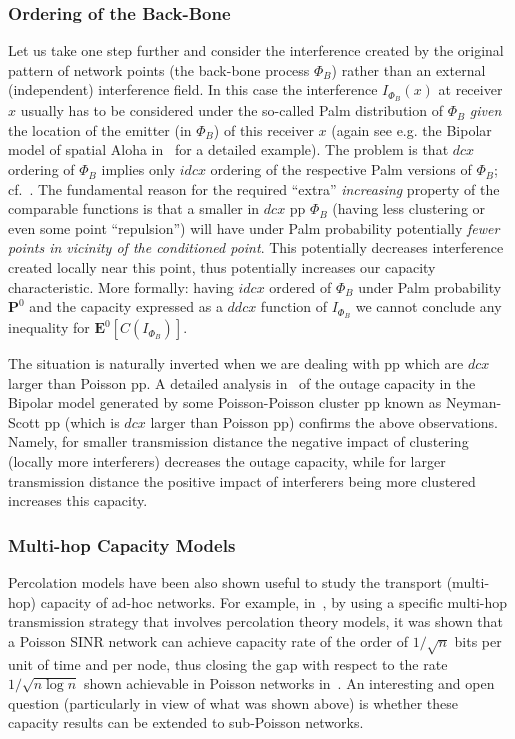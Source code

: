 \documentclass[conference]{IEEEtran}
\begin{document}
\subsubsection{Ordering of the Back-Bone}
Let us take one step further and consider the interference created by
the original pattern of network points (the back-bone process
$\Phi_B$) rather than an external (independent) interference field. 
In this case the interference $I_{\Phi_B}(x)$ at receiver $x$ usually has to be
considered under the so-called Palm distribution 
of $\Phi_B$ {\em given} the location of the emitter (in $\Phi_B$) of
this receiver $x$ (again see e.g. the Bipolar model of
spatial Aloha in~\cite[Chapter~16]{FnT2} for a detailed example).
The problem is that $dcx$ ordering of $\Phi_B$ implies only $idcx$
ordering of the respective Palm versions of $\Phi_B$;
cf.~\cite{snorder}. The fundamental
reason for the required ``extra'' {\em increasing} property  of the
comparable functions is that a smaller in $dcx$ pp $\Phi_B$ 
(having less clustering or even some point ``repulsion'') will  
have under Palm probability 
potentially {\em fewer points in vicinity of the conditioned point}.
This potentially decreases interference created locally near this
point, thus potentially increases our capacity characteristic.
More formally: having $idcx$ ordered of $\Phi_B$ under Palm
probability ${{\mathbf P}}^0$
and the capacity expressed as a $ddcx$ function of $I_{\Phi_B}$ we
cannot conclude any inequality for ${{\mathbf E}}^0[C(I_{\Phi_B})]$.

The situation is naturally inverted when we are dealing with pp which
are $dcx$ larger than Poisson pp.
A detailed analysis in~\cite{Ganti08}
of the outage capacity in the Bipolar model
generated by some  Poisson-Poisson cluster pp known as Neyman-Scott pp
(which is $dcx$ larger than Poisson pp)
confirms the above observations. Namely, for smaller transmission
distance the negative impact of clustering (locally more interferers) 
decreases the outage capacity, while for larger transmission distance 
the positive impact of interferers being more clustered increases this
capacity.

\subsubsection{Multi-hop Capacity Models} 
Percolation models have been also shown useful  to  study the 
transport (multi-hop) 
capacity of ad-hoc networks. For example, in~\cite{Franc_etal07},
by using a specific multi-hop transmission strategy that involves
percolation theory models, it was shown that a Poisson SINR network 
can achieve  capacity rate of the order of $1/\sqrt{n}$ bits
per unit of time and per node, thus closing the gap with respect to
the rate $1/\sqrt{n\log n}$ shown achievable in Poisson
networks in~\cite{Gupta00}. An interesting and open question (particularly in
view of what was shown above) is whether these capacity results can be
extended to sub-Poisson networks. 
\end{document}
